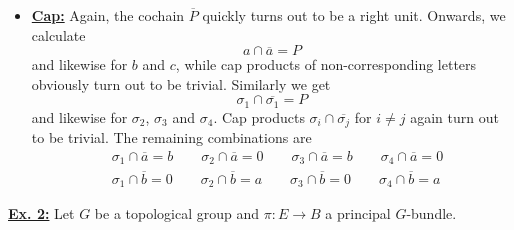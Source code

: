 \documentclass[a4paper, 12pt]{article}
\begin{document}
\begin{enumerate}[label=(\alph*)]
\begin{itemize}
		\item \underline{\textbf{Cap:}} Again, the cochain $\overline{P}$ quickly turns out to be a right unit. Onwards, we calculate
		\[
		a \cap \overline{a} = P
		\]
		and likewise for $b$ and $c$, while cap products of non-corresponding letters obviously turn out to be trivial.
		Similarly we get
		\[
		\sigma_1 \cap \overline{\sigma_1} = P
		\]
		and likewise for $\sigma_2$, $\sigma_3$ and $\sigma_4$. Cap products $\sigma_i \cap \overline{\sigma_j}$ for $i \neq j$ again turn out to be trivial.
		The remaining combinations are
		\begin{align*}
		&\sigma_1 \cap \overline{a} = b \quad\quad \sigma_2 \cap \overline{a} = 0 \quad\quad \sigma_3 \cap \overline{a} = b \quad\quad \sigma_4 \cap \overline{a} = 0 \\
		&\sigma_1 \cap \overline{b} = 0 \quad\quad \sigma_2 \cap \overline{b} = a \quad\quad \sigma_3 \cap \overline{b} = 0 \quad\quad \sigma_4 \cap \overline{b} = a
		\end{align*}
	\end{itemize}
\end{enumerate}

\underline{\textbf{Ex. 2:}}
Let $G$ be a topological group and $\pi \colon E \to B$ a principal $G$-bundle.
\end{document}
